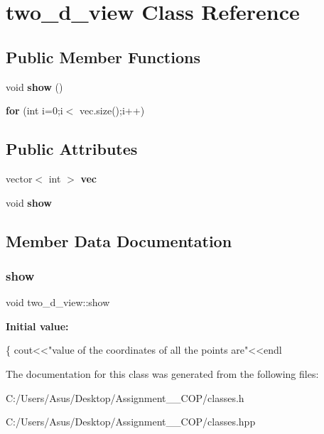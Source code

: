 \hypertarget{classtwo__d__view}{}\section{two\+\_\+d\+\_\+view Class Reference}
\label{classtwo__d__view}
\subsection*{Public Member Functions}
\begin{DoxyCompactItemize}
\item 
\mbox{\label{classtwo__d__view_ae5e5ac5666a2d7ab7e2a4f0363a2ef4e}} 
void {\bfseries show} ()
\item 
\mbox{\label{classtwo__d__view_a3ca4846a525b0f73be9fbbb8a2196630}} 
{\bfseries for} (int i=0;i$<$ vec.\+size();i++)
\end{DoxyCompactItemize}
\subsection*{Public Attributes}
\begin{DoxyCompactItemize}
\item 
\mbox{\label{classtwo__d__view_aeac03a4be8dd8a2471256de2c5397202}} 
vector$<$ int $>$ {\bfseries vec}
\item 
void {\bfseries show}
\end{DoxyCompactItemize}


\subsection{Member Data Documentation}
\mbox{\label{classtwo__d__view_aa452adab9f2ae1f81cc5de1a9ebf1971}} 
\subsubsection{\texorpdfstring{show}{show}}
{\footnotesize\ttfamily void two\+\_\+d\+\_\+view\+::show}

{\bfseries Initial value\+:}
\begin{DoxyCode}
\{
    cout<<\textcolor{stringliteral}{"value of the coordinates of all the points are"}<<endl
\end{DoxyCode}


The documentation for this class was generated from the following files\+:\begin{DoxyCompactItemize}
\item 
C\+:/\+Users/\+Asus/\+Desktop/\+Assignment\+\_\+\_\+\+C\+O\+P/classes.\+h\item 
C\+:/\+Users/\+Asus/\+Desktop/\+Assignment\+\_\+\_\+\+C\+O\+P/classes.\+hpp\end{DoxyCompactItemize}
